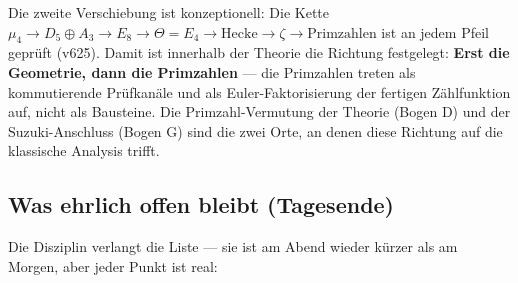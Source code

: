 \documentclass[11pt,a4paper]{article}
\begin{document}
Die zweite Verschiebung ist konzeptionell: Die Kette
$\mu_4 \to D_5 \oplus A_3 \to E_8 \to \Theta = E_4 \to \text{Hecke}
\to \zeta \to \text{Primzahlen}$ ist an jedem Pfeil geprüft (v625).
Damit ist innerhalb der Theorie die Richtung festgelegt:
\textbf{Erst die Geometrie, dann die Primzahlen} --- die Primzahlen
treten als kommutierende Prüfkanäle und als Euler-Faktorisierung der
fertigen Zählfunktion auf, nicht als Bausteine. Die
Primzahl-Vermutung der Theorie (Bogen D) und der Suzuki-Anschluss
(Bogen G) sind die zwei Orte, an denen diese Richtung auf die
klassische Analysis trifft.

\subsection*{Was ehrlich offen bleibt (Tagesende)}

Die Disziplin verlangt die Liste --- sie ist am Abend wieder kürzer
als am Morgen, aber jeder Punkt ist real:
\end{document}
